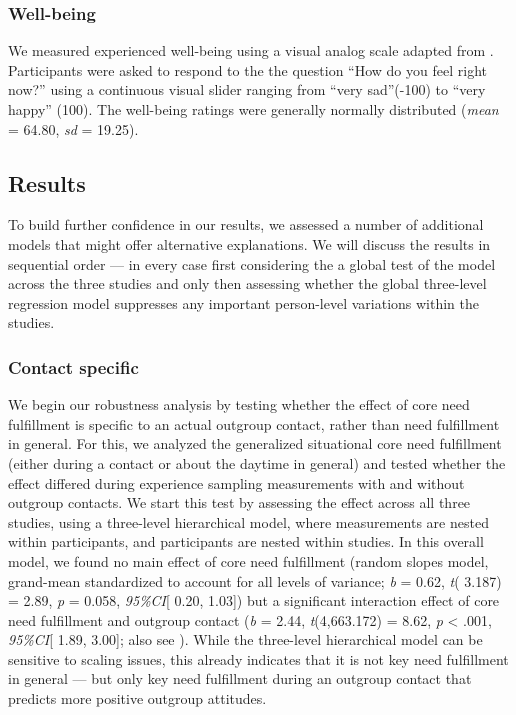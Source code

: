 \subsubsection{Well-being}

We measured experienced well-being using a visual analog scale adapted
from \citet{davies2022}. Participants were asked to respond to the the
question ``How do you feel right now?'' using a continuous visual slider
ranging from ``very sad''(-100) to ``very happy'' (100). The well-being
ratings were generally normally distributed (\textit{mean} = 64.80,
\textit{sd} = 19.25).

\subsection{Results}

To build further confidence in our results, we assessed a number of
additional models that might offer alternative explanations. We will
discuss the results in sequential order --- in every case first
considering the a global test of the model across the three studies and
only then assessing whether the global three-level regression model
suppresses any important person-level variations within the studies.

\subsubsection{Contact specific}

We begin our robustness analysis by testing whether the effect of core
need fulfillment is specific to an actual outgroup contact, rather than
need fulfillment in general. For this, we analyzed the generalized
situational core need fulfillment (either during a contact or about the
daytime in general) and tested whether the effect differed during
experience sampling measurements with and without outgroup contacts. We
start this test by assessing the effect across all three studies, using
a three-level hierarchical model, where measurements are nested within
participants, and participants are nested within studies. In this
overall model, we found no main effect of core need fulfillment (random
slopes model, grand-mean standardized to account for all levels of
variance; \textit{b} = 0.62, \textit{t}( 3.187) = 2.89, \textit{p} =
0.058, \textit{95\%CI}{[} 0.20, 1.03{]}) but a significant interaction
effect of core need fulfillment and outgroup contact (\textit{b} = 2.44,
\textit{t}(4,663.172) = 8.62, \textit{p} \textless{} .001,
\textit{95\%CI}{[} 1.89, 3.00{]}; also see
). While the three-level hierarchical
model can be sensitive to scaling issues, this already indicates that it
is not key need fulfillment in general --- but only key need fulfillment
during an outgroup contact that predicts more positive outgroup
attitudes.

